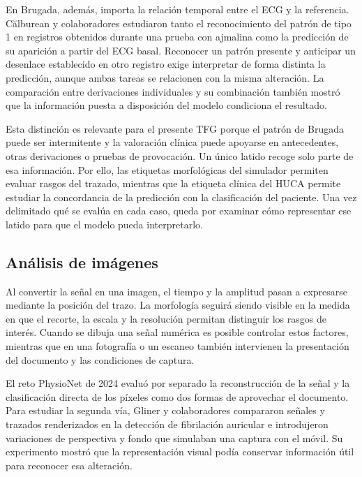 En Brugada, además, importa la relación temporal entre el ECG y la referencia. Călburean y colaboradores estudiaron tanto el reconocimiento del patrón de tipo 1 en registros obtenidos durante una prueba con ajmalina como la predicción de su aparición a partir del ECG basal. Reconocer un patrón presente y anticipar un desenlace establecido en otro registro exige interpretar de forma distinta la predicción, aunque ambas tareas se relacionen con la misma alteración. La comparación entre derivaciones individuales y su combinación también mostró que la información puesta a disposición del modelo condiciona el resultado. \cite{calburean2024brugada}

Esta distinción es relevante para el presente TFG porque el patrón de Brugada puede ser intermitente y la valoración clínica puede apoyarse en antecedentes, otras derivaciones o pruebas de provocación. Un único latido recoge solo parte de esa información. Por ello, las etiquetas morfológicas del simulador permiten evaluar rasgos del trazado, mientras que la etiqueta clínica del HUCA permite estudiar la concordancia de la predicción con la clasificación del paciente. Una vez delimitado qué se evalúa en cada caso, queda por examinar cómo representar ese latido para que el modelo pueda interpretarlo. \cite{zeppenfeld2022,wilde2023scbt}

\subsection{Análisis de imágenes}

Al convertir la señal en una imagen, el tiempo y la amplitud pasan a expresarse mediante la posición del trazo. La morfología seguirá siendo visible en la medida en que el recorte, la escala y la resolución permitan distinguir los rasgos de interés. Cuando se dibuja una señal numérica es posible controlar estos factores, mientras que en una fotografía o un escaneo también intervienen la presentación del documento y las condiciones de captura. \cite{kligfield2007,reyna2024challenge}

El reto PhysioNet de 2024 evaluó por separado la reconstrucción de la señal y la clasificación directa de los píxeles como dos formas de aprovechar el documento. Para estudiar la segunda vía, Gliner y colaboradores compararon señales y trazados renderizados en la detección de fibrilación auricular e introdujeron variaciones de perspectiva y fondo que simulaban una captura con el móvil. Su experimento mostró que la representación visual podía conservar información útil para reconocer esa alteración. \cite{reyna2024challenge,gliner2020}

